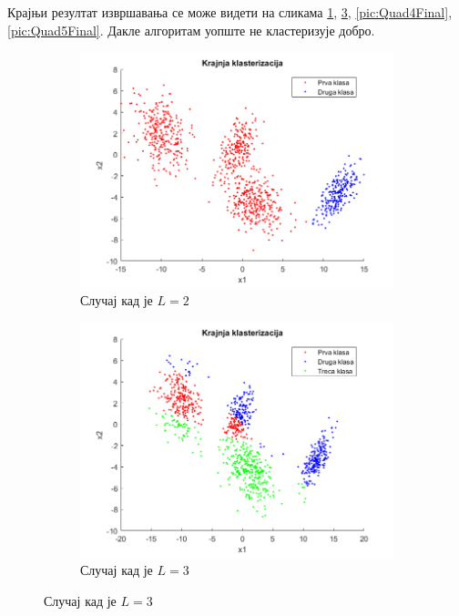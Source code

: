 Крајњи резултат извршавања се може видети на сликама  \ref{pic:Quad2Final}, \ref{pic:Quad3Final}, \ref{pic:Quad4Final}, \ref{pic:Quad5Final}.	 Дакле алгоритам уопште не кластеризује добро.
\begin{figure}[htb!]\caption{Крајња кластеризација}
\begin{subfigure}{.6\textwidth}
\centering
\includegraphics[width=1\textwidth]{pictures/4/Quad2Final}
\caption{Случај кад је $L=2$}\label{pic:Quad2Final}
\end{subfigure}
\begin{subfigure}{.55\textwidth}
\centering
\includegraphics[width=1\linewidth]{pictures/4/Quad3Final}
\caption{Случај кад је $L=3$}\label{pic:Quad3Final}
\end{subfigure}

\end{figure}
